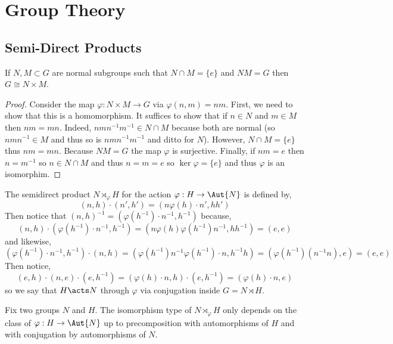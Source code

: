\documentclass[12pt]{article}
\begin{document}
\section{Group Theory}

\subsection{Semi-Direct Products}

\begin{prop}
If $N, M \subset G$ are normal subgroups such that $N \cap M = \{ e \}$ and $NM = G$ then $G \cong N \times M$.
\end{prop}

\begin{proof}
Consider the map $\varphi : N \times M \to G$ via $\varphi(n,m) = nm$. First, we need to show that this is a homomorphism. It suffices to show that if $n \in N$ and $m \in M$ then $nm = mn$. Indeed, $nmn^{-1}m^{-1} \in N \cap M$ because both are normal (so $n m n^{-1} \in M$ and thus so is $n m n^{-1} m^{-1}$ and ditto for $N$). However, $N \cap M = \{ e \}$ thus $nm = mn$. Because $NM = G$ the map $\varphi$ is surjective. Finally, if $nm = e$ then $n = m^{-1}$ so $n \in N \cap M$ and thus $n = m = e$ so $\ker{\varphi} = \{ e \}$ and thus $\varphi$ is an isomorphim.
\end{proof}

\begin{rmk}
The semidirect product $N \rtimes_{\varphi} H$ for the action $\varphi : H \to \Aut{N}$ is defined by,
\[ (n,h) \cdot (n', h') = (n \varphi(h) \cdot n', h h') \] Then notice that $(n, h)^{-1} = (\varphi(h^{-1}) \cdot n^{-1}, h^{-1})$ because,
\[ (n, h) \cdot (\varphi(h^{-1}) \cdot n^{-1}, h^{-1}) = (n \varphi(h) \varphi(h^{-1}) n^{-1}, h h^{-1}) = (e,e) \]
and likewise,
\[ (\varphi(h^{-1}) \cdot n^{-1}, h^{-1}) \cdot (n, h) = (\varphi(h^{-1}) n^{-1} \varphi(h^{-1}) \cdot n, h^{-1} h) = (\varphi(h^{-1}) (n^{-1} n), e) = (e, e) \]
Then notice,
\[ (e, h) \cdot (n, e) \cdot (e, h^{-1}) = (\varphi(h) \cdot n, h) \cdot (e, h^{-1}) = (\varphi(h) \cdot n, e) \]
so we say that $H \acts N$ through $\varphi$ via conjugation inside $G = N \rtimes H$. 
\end{rmk}

\begin{prop}
Fix two groups $N$ and $H$. The isomorphism type of $N \rtimes_\varphi H$ only depends on the class of $\varphi : H \to \Aut{N}$ up to precomposition with automorphisms of $H$ and with conjugation by automorphisms of $N$.
\end{prop}
\end{document}
